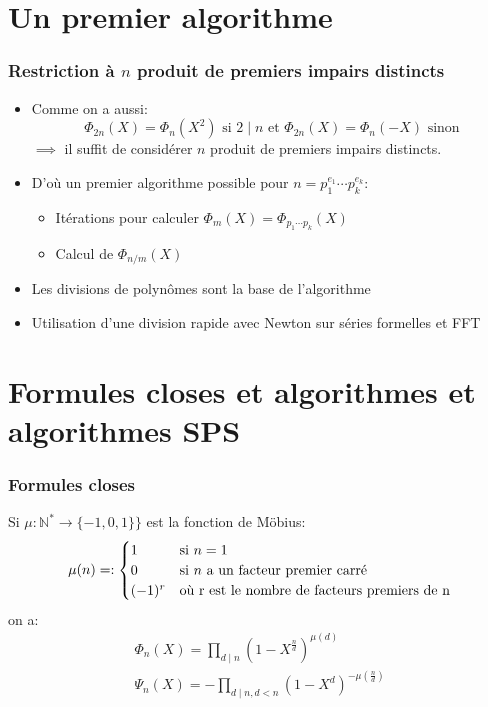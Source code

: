 \documentclass{beamer}
\begin{document}
	\section{Un premier algorithme}

	\begin{frame}
		\frametitle{Restriction à $n$ produit de premiers impairs distincts}
		\begin{itemize}
			\item Comme on a aussi: $$\Phi_{2n}(X) = \Phi_n(X^2) \text{ si } 2 \mid n \text{ et }\Phi_{2n}(X) = \Phi_n(-X) \text{ sinon}$$ $\implies$ il suffit de considérer $n$ produit de premiers impairs distincts.
			\item D'où un premier algorithme possible pour $n = p_1^{e_1} \cdots p_k^{e_k}$:
			\begin{itemize}
				\item Itérations pour calculer $\Phi_m(X) = \Phi_{p_1 \cdots p_k}(X)$
				\item Calcul de $\Phi_{n/m}(X)$
			\end{itemize}
			\item Les divisions de polynômes sont la base de l'algorithme
			\item Utilisation d'une division rapide avec Newton sur séries formelles et FFT
		\end{itemize}
	\end{frame}

	\section{Formules closes et algorithmes et algorithmes SPS}

	\begin{frame}
		\frametitle{Formules closes}
		Si $\mu : \mathbb N^* \to \{-1, 0, 1\}\}$ est la fonction de Möbius:
		\begin{displaymath}
			\mu(n) = :
			\begin{cases}
				1 & \text{si } n = 1\\
				0 & \text{si } n \text{ a un facteur premier carré}\\
				(-1)^r & \text{où } $r$ \text{ est le nombre de facteurs premiers de } $n$\\
			\end{cases}
		\end{displaymath}
		on a:
		\begin{align}		
			\Phi_n(X) = \prod_{d \mid n} (1 - X^\frac{n}{d})^{\mu(d)} \tag{2.4}\label{mobphi}\\
			\Psi_n(X) = -\prod_{d \mid n, d<n} (1 - X^d)^{-\mu(\frac{n}{d})}\tag{2.5}\label{mobpsi}
		\end{align}
	\end{frame}
\end{document}
